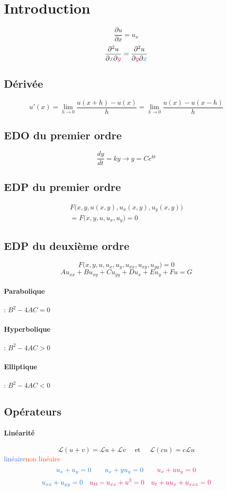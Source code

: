 \documentclass[resume]{subfiles}
\begin{document}
\section{Introduction}
$$\boxed{\frac{\partial u}{\partial x}=u_x}$$
$$\frac{\partial^2 u}{\partial \textcolor{RoyalBlue}{x}\partial \textcolor{OrangeRed}{y}}=\frac{\partial^2 u}{\partial \textcolor{OrangeRed}{y}\partial \textcolor{RoyalBlue}{x}}$$
\subsection{Dérivée}
$$u'(x)=\lim_{h\to 0}\frac{u(x+h)-u(x)}{h}=\lim_{h\to 0}\frac{u(x)-u(x-h)}{h}$$
\subsection{EDO du premier ordre}
$$\boxed{\frac{dy}{dt}=ky\longrightarrow y=Ce^{kt}}$$
\subsection{EDP du premier ordre}
\begin{multline*}
F\Big(x,y,u(x,y),u_x(x,y),u_y(x,y)\Big)\\=F\Big(x,y,u,u_x,u_y\Big)=0
\end{multline*}
\subsection{EDP du deuxième ordre}
$$F\Big(x,y,u,u_x,u_y,u_{xx},u_{xy},u_{yy}\Big)=0$$
$$Au_{xx}+Bu_{xy}+Cu_{yy}+Du_x+Eu_y+Fu=G$$
\paragraph{Parabolique} : $B^2-4AC=0$
\paragraph{Hyperbolique} : $B^2-4AC>0$
\paragraph{Elliptique} : $B^2-4AC<0$
\subsection{Opérateurs}
\paragraph{Linéarité}
$$\mathcal{L}(u+v)=\mathcal{L}u+\mathcal{L}v\quad \text{ et }\quad \mathcal{L}(cu)=c\mathcal{L}u$$
\hfill \textcolor{RoyalBlue}{linéaire}\hfill \textcolor{OrangeRed}{non linéaire}\hfill \
$$\textcolor{RoyalBlue}{u_x+u_y=0}\qquad \textcolor{RoyalBlue}{u_x+yu_y=0}\qquad \textcolor{OrangeRed}{u_x+uu_y=0}$$
$$\textcolor{RoyalBlue}{u_{xx}+u_{yy}=0}\quad \textcolor{OrangeRed}{u_{tt}-u_{xx}+u^3=0}\quad \textcolor{OrangeRed}{u_t+uu_x+u_{xxx}=0}$$
\end{document}
